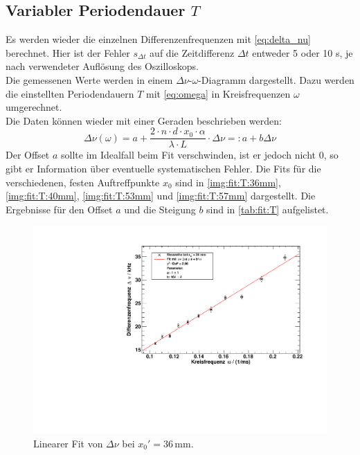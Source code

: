 \subsection{Variabler Periodendauer \texorpdfstring{$T$}{T}}
Es werden wieder die einzelnen Differenzenfrequenzen mit \autoref{eq:delta_nu} berechnet. Hier ist der Fehler $s_{\Delta t}$ 
auf die Zeitdifferenz $\Delta t$ entweder 5 oder 10 \textmu s, je nach verwendeter Auflösung des Oszilloskops. \\
Die gemessenen Werte werden in einem $\Delta \nu$-$\omega$-Diagramm dargestellt. 
Dazu werden die einstellten Periodendauern $T$ mit \autoref{eq:omega} in Kreisfrequenzen $\omega$ umgerechnet. \\
Die Daten können wieder mit einer Geraden beschrieben werden:
\begin{equation}
  \Delta \nu (\omega) = a + \frac{2 \cdot n \cdot d \cdot x_0 \cdot \alpha}{\lambda \cdot L} \cdot \Delta \nu  =: a + b \Delta \nu
\end{equation}
Der Offset $a$ sollte im Idealfall beim Fit verschwinden, ist er jedoch nicht 0, so gibt er Information über eventuelle systematischen Fehler.
Die Fits für die verschiedenen, festen Auftreffpunkte $x_0$ sind in \autoref{img:fit:T:36mm}, \autoref{img:fit:T:40mm}, \autoref{img:fit:T:53mm} 
und \autoref{img:fit:T:57mm} dargestellt. Die Ergebnisse für den Offset $a$ und die Steigung $b$ sind in \autoref{tab:fit:T} aufgelistet.

\begin{figure}[H]
\begin{center}
  \includegraphics[width=\textwidth]{../img/fit_x0_36mm.pdf}
  \caption{Linearer Fit von $\Delta \nu$ bei $x_0' = 36$\,mm.}
  \label{img:fit:T:36mm}
\end{center}
\end{figure}

